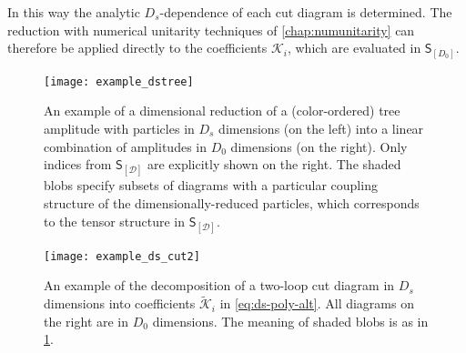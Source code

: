 In this way the analytic $D_s$-dependence of each cut diagram is determined.
The reduction with numerical unitarity techniques of \cref{chap:numunitarity} 
can therefore be applied directly to the coefficients $\mathcal{\mathcal{K}}_i$, which are evaluated in $\mathsf{S}_{[D_0]}$.

\begin{figure}[ht]
  \centering
  \texttt{[image: example\_dstree]}
  \caption{An example of a dimensional reduction of a (color-ordered) 
    tree amplitude with particles in $D_s$ dimensions (on the left) into
    a linear combination of amplitudes in $D_0$ dimensions (on the right). 
    Only indices from $\mathsf{S}_{[\mathcal{D}]}$ are explicitly shown on the right.
    The shaded blobs specify subsets of diagrams with a particular coupling structure of the dimensionally-reduced particles, 
    which corresponds to the tensor structure in $\mathsf{S}_{[\mathcal{D}]}$.
  }
  \label{fig:example_dstree}
\end{figure}


\begin{figure}[ht]
  \centering
  \texttt{[image: example\_ds\_cut2]}
  \caption{
    An example of the decomposition of a two-loop cut diagram in $D_s$ dimensions into coefficients $\tilde{\mathcal{K}}_i$ in \cref{eq:ds-poly-alt}.
    All diagrams on the right are in $D_0$ dimensions. The meaning of shaded blobs is as in \cref{fig:example_dstree}.
  }
  \label{fig:example_ds_cut2}
\end{figure}

